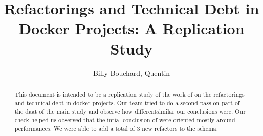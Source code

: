 \documentclass[lettersize,journal]{IEEEtran}
\begin{document}
\title{Refactorings and Technical Debt in Docker Projects: A Replication Study}

\author{Billy Bouchard, Quentin }


\maketitle

\begin{abstract}
This document is intended to be a replication study of the work of \cite{1} on the refactorings and technical debt in docker projects.
Our team tried to do a second pass on part of the daat of the main study and observe how different\/similar our conclusions were.
Our check helped us observed that the intial conclusion of \cite{1} were oriented mostly around performances.
We were able to add a total of 3 new refactors to the schema. 
\end{abstract}

\end{document}
